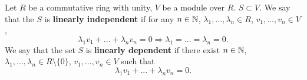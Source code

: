 \begin{definition}
  Let
    $R$ be a commutative ring with unity,
    $V$ be a module over $R$.
    $S \subset V$.
  We say that the $S$ is \textbf{linearly independent} if
  for any $n \in \mathbb{N}$, $\lambda_1, ..., \lambda_n \in R$, $v_1, ..., v_n \in V$,
  \begin{equation}
    \lambda_1 v_1 + ... + \lambda_n v_n = 0
    \Rightarrow \lambda_1 = ... = \lambda_n = 0.
  \end{equation}
  We say that the set $S$ is \textbf{linearly dependent} if
  there exist $n \in \mathbb{N}$, $\lambda_1, ..., \lambda_n \in R \setminus \{0\}$,
  $v_1, ..., v_n \in V$ such that
  \begin{equation}
    \lambda_1 v_1 + ... + \lambda_n v_n = 0.
  \end{equation}
\end{definition}
